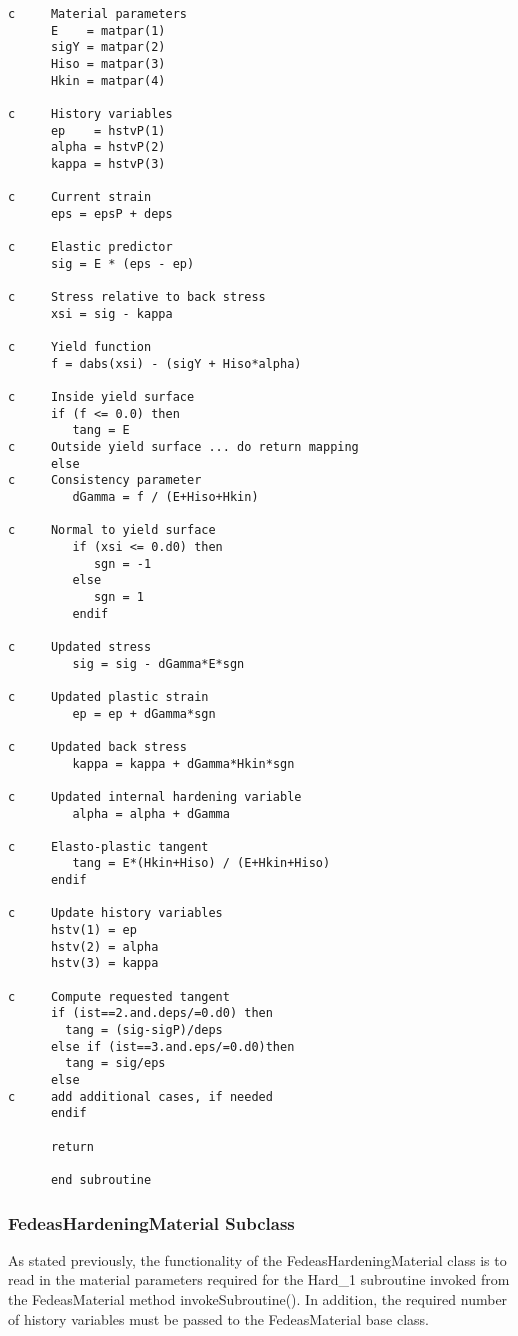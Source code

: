 \documentclass[12pt]{article}
\begin{document}
{{\begin{verbatim}
c     Material parameters
      E    = matpar(1)
      sigY = matpar(2)
      Hiso = matpar(3)
      Hkin = matpar(4)

c     History variables
      ep    = hstvP(1)
      alpha = hstvP(2)
      kappa = hstvP(3)

c     Current strain
      eps = epsP + deps    

c     Elastic predictor
      sig = E * (eps - ep)

c     Stress relative to back stress
      xsi = sig - kappa

c     Yield function
      f = dabs(xsi) - (sigY + Hiso*alpha)

c     Inside yield surface
      if (f <= 0.0) then
         tang = E
c     Outside yield surface ... do return mapping
      else
c     Consistency parameter
         dGamma = f / (E+Hiso+Hkin)

c     Normal to yield surface
         if (xsi <= 0.d0) then
            sgn = -1
         else
            sgn = 1
         endif

c     Updated stress
         sig = sig - dGamma*E*sgn
	
c     Updated plastic strain
         ep = ep + dGamma*sgn

c     Updated back stress
         kappa = kappa + dGamma*Hkin*sgn
	
c     Updated internal hardening variable
         alpha = alpha + dGamma

c     Elasto-plastic tangent
         tang = E*(Hkin+Hiso) / (E+Hkin+Hiso)
      endif

c     Update history variables
      hstv(1) = ep
      hstv(2) = alpha
      hstv(3) = kappa

c     Compute requested tangent
      if (ist==2.and.deps/=0.d0) then
      	tang = (sig-sigP)/deps
      else if (ist==3.and.eps/=0.d0)then
      	tang = sig/eps
      else
c     add additional cases, if needed
      endif	         

      return

      end subroutine 
\end{verbatim}
}

\subsubsection{FedeasHardeningMaterial Subclass}
As stated previously, the functionality of the FedeasHardeningMaterial class is to read
in the material parameters required for the Hard\_1 subroutine invoked from the
FedeasMaterial method invokeSubroutine(). In addition, the required number of
history variables must be passed to the FedeasMaterial base class.

}
\end{document}
